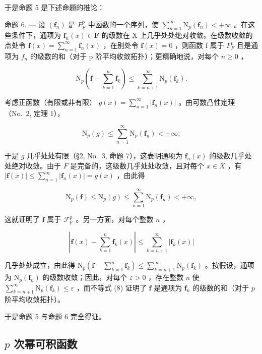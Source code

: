 于是命题 5 是下述命题的推论：

命题 6. --- 设 \((\mathbf{f}_{n})\) 是 \(F_{F}^{p}\) 中函数的一个序列，使 \(\sum_{n=1}^{\infty}\mathrm{N}_{p}(\mathbf{f}_{n})<+\infty\) 。在这些条件下，通项为 \(\mathbf{f}_{n}(x)\in\mathbf{F}\) 的级数在 X 上几乎处处绝对收敛。在级数收敛的点处令 \(\mathbf{f}(x)=\sum_{n=1}^{\infty}\mathbf{f}_{n}(x)\) ，在别处令 \(\mathbf{f}(x)=0\) ，则函数 f 属于 \(F_{F}^{p}\) 且是通项为 \(f_{n}\) 的级数的和（对于 p 阶平均收敛拓扑）；更精确地说，对每个 \(n\geqslant0\) ，

\[
\mathrm{N} _ {p} \left(\mathbf {f} - \sum_ {k = 1} ^ {n} \mathbf {f} _ {k}\right) \leqslant \sum_ {k = n + 1} ^ {\infty} \mathrm{N} _ {p} (\mathbf {f} _ {k}).\tag{8}
\]

考虑正函数（有限或非有限） \(g(x) = \sum_{n=1}^{\infty} |\mathbf{f}_n(x)|\) 。由可数凸性定理（No.~2, 定理 1），

\[
\mathrm{N} _ {p} (g) \leqslant \sum_ {n = 1} ^ {\infty} \mathrm{N} _ {p} (\mathbf {f} _ {n}) <   + \infty ;
\]

于是 \(g\) 几乎处处有限（§2, No.~3, 命题 7），这表明通项为 \(\mathbf{f}_n(x)\) 的级数几乎处处绝对收敛。由于 \(F\) 是完备的，这级数几乎处处收敛，且对每个 \(x \in X\) ，有 \(|\mathbf{f}(x)| \leqslant \sum_{n=1}^{\infty} |\mathbf{f}_n(x)| = g(x)\) ，由此得

\[
\mathrm{N} _ {p} (\mathbf {f}) \leqslant \mathrm{N} _ {p} (g) \leqslant \sum_ {n = 1} ^ {\infty} \mathrm{N} _ {p} (\mathbf {f} _ {n}) <   + \infty ,
\]

这就证明了 \(\mathbf{f}\) 属于 \(\mathcal{F}_{\mathrm{F}}^{p}\) 。另一方面，对每个整数 \(n\) ，

\[
\left| \mathbf {f} (x) - \sum_ {k = 1} ^ {n} \mathbf {f} _ {k} (x) \right| \leqslant \sum_ {k = n + 1} ^ {\infty} | \mathbf {f} _ {k} (x) |
\]

几乎处处成立，由此得 \(\mathrm{N}_{p}\left(\mathbf{f}-\sum_{k=1}^{n}\mathbf{f}_{k}\right)\leqslant\sum_{k=n+1}^{\infty}\mathrm{N}_{p}(\mathbf{f}_{k})\) 。按假设，通项为 \(\mathrm{N}_{p}(\mathbf{f}_{n})\) 的级数收敛；因此，对每个 \(\varepsilon > 0\) ，存在整数 \(n\) 使 \(\sum_{k=n+1}^{\infty} \mathrm{N}_{p}(\mathbf{f}_{k}) \leqslant \varepsilon\) ，而不等式 (8) 证明了 \(\mathbf{f}\) 是通项为 \(\mathbf{f}_{n}\) 的级数的和（对于 \(p\) 阶平均收敛拓扑）。

于是命题 5 与命题 6 完全得证。

\subsection{\texorpdfstring{\(p\) 次幂可积函数}{p 次幂可积函数}}

